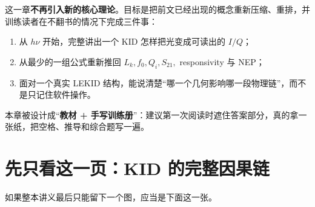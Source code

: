 \documentclass[11pt,a4paper,openany]{ctexrep}
\begin{document}
\begin{goalbox}
这一章\textbf{不再引入新的核心理论}。目标是把前文已经出现的概念重新压缩、重排，并训练读者在不翻书的情况下完成三件事：
\begin{enumerate}
  \item 从 $h\nu$ 开始，完整讲出一个 KID 怎样把光变成可读出的 $I/Q$；
  \item 从最少的一组公式重新推回 $L_k,f_0,Q_i,S_{21},$ responsivity 与 NEP；
  \item 面对一个真实 LEKID 结构，能说清楚“哪一个几何影响哪一段物理链”，而不是只记住软件操作。
\end{enumerate}
本章被设计成“\textbf{教材 + 手写训练册}”：建议第一次阅读时遮住答案部分，真的拿一张纸，把空格、推导和综合题写一遍。
\end{goalbox}

\section{先只看这一页：KID 的完整因果链}

如果整本讲义最后只能留下一个图，应当是下面这一张。
\end{document}
